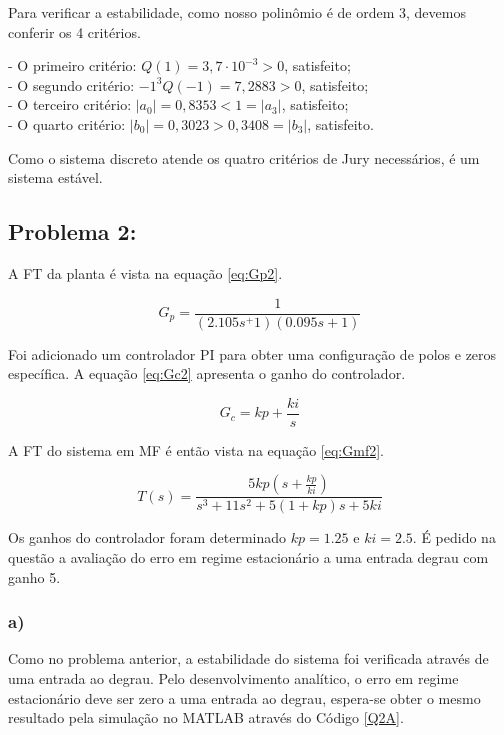 Para verificar a estabilidade, como nosso polinômio é de ordem 3, devemos conferir os 4 critérios.

- O primeiro critério: $Q(1)= 3,7 \cdot 10^{-3} > 0$, satisfeito; \\
- O segundo critério: $-1^3 Q(-1) = 7,2883 > 0$, satisfeito;\\
- O terceiro critério: $|a_0| = 0,8353 < 1 = |a_3|$, satisfeito; \\
- O quarto critério: $|b_0| = 0,3023 > 0,3408 = |b_3| $, satisfeito. 

Como o sistema discreto atende os quatro critérios de Jury necessários, é um sistema estável.

\subsection*{Problema 2:}

    A FT da planta é vista na equação \ref{eq:Gp2}. 

    \begin{equation}
        G_p = \frac{1}{(2.105s^+1)(0.095s+1)}
        \label{eq:Gp2}
    \end{equation}

    Foi adicionado um controlador PI para obter uma configuração de polos e zeros específica. A equação \ref{eq:Gc2} apresenta
    o ganho do controlador. 

    \begin{equation}
        G_c = kp + \frac{ki}{s}
        \label{eq:Gc2}
    \end{equation}

    A FT do sistema em MF é então vista na equação \ref{eq:Gmf2}.

    \begin{equation}
        T(s) = \frac{5kp(s+\frac{kp}{ki})}{s^3+11s^2+5(1+kp)s+5ki}
        \label{eq:Gmf2}
    \end{equation}

    Os ganhos do controlador foram determinado $kp=1.25$ e $ki = 2.5$. É pedido na questão a avaliação do erro em regime
    estacionário a uma entrada degrau com ganho 5. 

    \subsubsection*{a)}
        Como no problema anterior, a estabilidade do sistema foi verificada através de uma entrada ao degrau. 
        Pelo desenvolvimento analítico, o erro em regime estacionário deve ser zero a uma entrada ao degrau, 
        espera-se obter o mesmo resultado pela simulação no MATLAB através do Código \ref{Q2A}.

